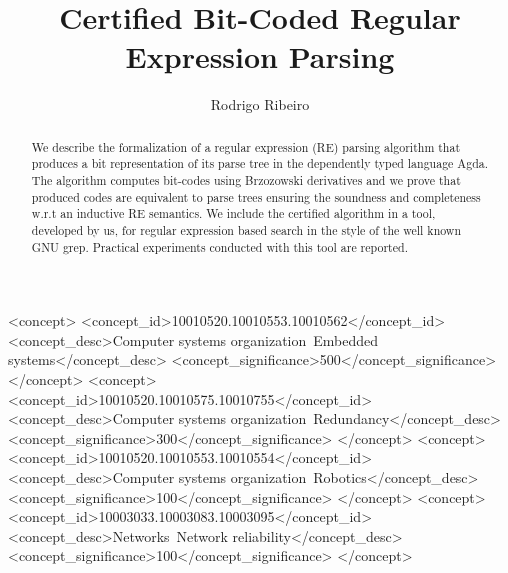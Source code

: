 \documentclass[sigplan, anonymous, review]{acmart}
\def\resethooks{%
  \global\let\SaveRestoreHook\empty
  \global\let\ColumnHook\empty}
\let\hspre\empty
\let\hspost\empty
\theoremstyle{definition}
\newcommand{\V}[1]{\purple{\mathit{#1}}}
\begin{document}
\title{Certified Bit-Coded Regular Expression Parsing}

\author{Rodrigo Ribeiro}

\begin{abstract}
We describe the formalization of a regular expression (RE) parsing
algorithm that produces a bit representation of its parse tree
in the dependently typed language Agda. The algorithm computes
bit-codes using Brzozowski derivatives and we prove that 
produced codes are equivalent to parse trees ensuring the 
soundness and completeness w.r.t an inductive RE semantics.
We include the certified algorithm in a tool, developed by us,
for regular expression based search in the style of the well 
known GNU grep. Practical experiments conducted with this tool 
are reported.
\end{abstract}
%
%
\begin{CCSXML}\begin{hscode}\SaveRestoreHook
\column{B}{@{}>{\hspre}l<{\hspost}@{}}%
\column{E}{@{}>{\hspre}l<{\hspost}@{}}%
\>[B]{}\V{ccs2012>}{}\<[E]%
\ColumnHook
\end{hscode}\resethooks
 <concept>
  <concept_id>10010520.10010553.10010562</concept_id>
  <concept_desc>Computer systems organization~Embedded systems</concept_desc>
  <concept_significance>500</concept_significance>
 </concept>
 <concept>
  <concept_id>10010520.10010575.10010755</concept_id>
  <concept_desc>Computer systems organization~Redundancy</concept_desc>
  <concept_significance>300</concept_significance>
 </concept>
 <concept>
  <concept_id>10010520.10010553.10010554</concept_id>
  <concept_desc>Computer systems organization~Robotics</concept_desc>
  <concept_significance>100</concept_significance>
 </concept>
 <concept>
  <concept_id>10003033.10003083.10003095</concept_id>
  <concept_desc>Networks~Network reliability</concept_desc>
  <concept_significance>100</concept_significance>
 </concept>\begin{hscode}\SaveRestoreHook
\column{B}{@{}>{\hspre}l<{\hspost}@{}}%
\column{E}{@{}>{\hspre}l<{\hspost}@{}}%
\>[B]{}\V{/ccs2012>}{}\<[E]%
\ColumnHook
\end{hscode}\resethooks
\end{CCSXML}
\end{document}
